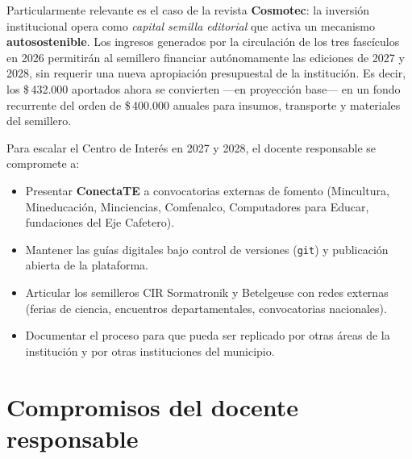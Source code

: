 \documentclass[12pt, letterpaper]{article}
\newcommand{\pesos}[1]{\$\,#1}
\newcommand{\conectate}{\textbf{ConectaTE}}
\begin{document}
Particularmente relevante es el caso de la revista \textbf{Cosmotec}: la inversión institucional opera como \textit{capital semilla editorial} que activa un mecanismo \textbf{autosostenible}. Los ingresos generados por la circulación de los tres fascículos en 2026 permitirán al semillero financiar autónomamente las ediciones de 2027 y 2028, sin requerir una nueva apropiación presupuestal de la institución. Es decir, los \pesos{432.000} aportados ahora se convierten —en proyección base— en un fondo recurrente del orden de \pesos{400.000} anuales para insumos, transporte y materiales del semillero.

Para escalar el Centro de Interés en 2027 y 2028, el docente responsable se compromete a:

\begin{itemize}[leftmargin=*]
  \item Presentar \conectate{} a convocatorias externas de fomento (Mincultura, Mineducación, Minciencias, Comfenalco, Computadores para Educar, fundaciones del Eje Cafetero).
  \item Mantener las guías digitales bajo control de versiones (\texttt{git}) y publicación abierta de la plataforma.
  \item Articular los semilleros CIR Sormatronik y Betelgeuse con redes externas (ferias de ciencia, encuentros departamentales, convocatorias nacionales).
  \item Documentar el proceso para que pueda ser replicado por otras áreas de la institución y por otras instituciones del municipio.
\end{itemize}

\section{Compromisos del docente responsable}
\end{document}
